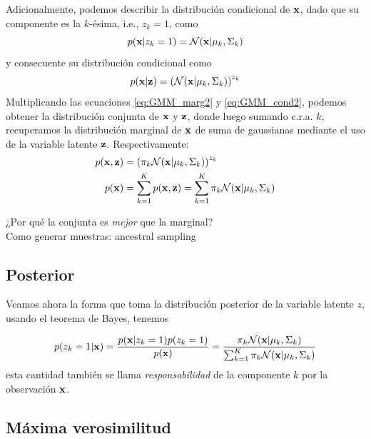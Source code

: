 Adicionalmente, podemos describir la distribución condicional de $\mathbf{x}$, dado que su componente es la $k$-ésima, i.e., $z_k=1$, como 
\begin{equation}
	p(\mathbf{x}|z_{k}=1) = {\mathcal N}(\mathbf{x}|\mu_k,\Sigma_k) \label{eq:GMM_cond1}
\end{equation}
y consecuente su distribución condicional como 
\begin{equation}
	p(\mathbf{x}|\mathbf{z}) = \left({\mathcal N}(\mathbf{x}|\mu_k,\Sigma_k)\right)^{z_k} \label{eq:GMM_cond2}
\end{equation}
Multiplicando las ecuaciones \eqref{eq:GMM_marg2} y \eqref{eq:GMM_cond2}, podemos obtener la distribución conjunta de $\mathbf{x}$ y $\mathbf{z}$, donde luego sumando  c.r.a. $k$, recuperamos la distribución marginal de $\mathbf{x}$ de suma de gaussianas mediante el uso de la variable latente $\mathbf{z}$. Respectivamente: 
\begin{align}
	p(\mathbf{x},\mathbf{z}) &= \left(\pi_k{\mathcal N}(\mathbf{x}|\mu_k,\Sigma_k)\right)^{z_k}\\
	p(\mathbf{x}) 	&= \sum_{k=1}^K p(\mathbf{x},\mathbf{z}) = \sum_{k=1}^K \pi_k {\mathcal N}(\mathbf{x}|\mu_k,\Sigma_k)
\end{align}

\begin{mdframed}[style=pendiente, frametitle={\center discusión}]
¿Por qué la conjunta es \emph{mejor} que la marginal?\\
Como generar muestras: ancestral sampling

\end{mdframed}


\subsection{Posterior} 
\label{sub:GMM_posterior}

Veamos ahora la forma que toma la distribución posterior de la variable latente $z$, usando el teorema de Bayes, tenemos 

\begin{align}
	p(z_k=1|\mathbf{x}) = \frac{p(\mathbf{x}|z_k=1)p(z_k=1)}{p(\mathbf{x})} = \frac{\pi_k {\mathcal N}(\mathbf{x}|\mu_k,\Sigma_k)}{\sum_{k=1}^K \pi_k {\mathcal N}(\mathbf{x}|\mu_k,\Sigma_k)} \label{eq:GMM_post1}
\end{align}
esta cantidad también se llama \emph{responsabilidad} de la componente $k$ por la observación $\mathbf{x}$.

\subsection{Máxima verosimilitud} 
\label{sub:GMM_ml}

